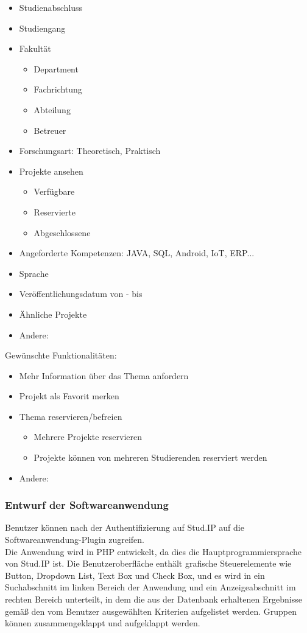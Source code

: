 	\begin{itemize}
	\item Studienabschluss
	\item Studiengang
	\item Fakultät
		\begin{itemize}[noitemsep]
			\item Department
			\item Fachrichtung
			\item Abteilung
			\item Betreuer
		\end{itemize}
	\item Forschungsart: Theoretisch, Praktisch
	\item Projekte ansehen
		\begin{itemize}[noitemsep]
			\item Verfügbare
			\item Reservierte
			\item Abgeschlossene
		\end{itemize}
	\item Angeforderte Kompetenzen: JAVA, SQL, Android, IoT, ERP{...}
	\item Sprache
	\item Veröffentlichungsdatum von - bis
	\item Ähnliche Projekte
	\item Andere:
	\end{itemize}
Gewünschte Funktionalitäten:
	
	\begin{itemize}
	\item Mehr Information über das Thema anfordern
	\item Projekt als Favorit merken
	\item Thema reservieren/befreien
	\begin{itemize}[noitemsep]
		\item Mehrere Projekte reservieren
		\item Projekte können von mehreren Studierenden reserviert werden
	\end{itemize}
	\item Andere:	
	\end{itemize}

\subsubsection{Entwurf der Softwareanwendung}
Benutzer können nach der Authentifizierung auf Stud.IP auf die Softwareanwendung-Plugin zugreifen.\\
Die Anwendung wird in PHP entwickelt, da dies die Hauptprogrammiersprache von Stud.IP ist.
Die Benutzeroberfläche enthält grafische Steuerelemente wie Button, Dropdown List, Text Box und Check Box, und es wird in ein Suchabschnitt im linken Bereich der Anwendung und ein Anzeigeabschnitt im rechten Bereich unterteilt, in dem die aus der Datenbank erhaltenen Ergebnisse gemä{\ss} den vom Benutzer ausgewählten Kriterien aufgelistet werden. Gruppen können zusammengeklappt und  aufgeklappt werden.\\

